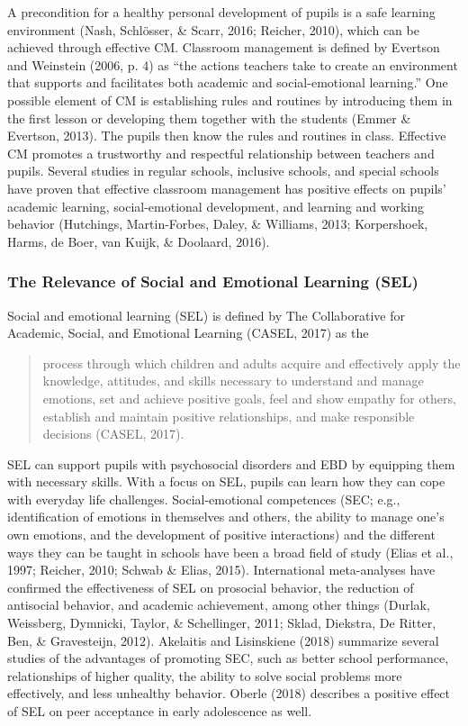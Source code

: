 \documentclass[11.5pt]{sig-alternate} %
\begin{document}
\begin{large}
A precondition for a healthy personal development of pupils is a safe learning environment (Nash, Schlösser, \& Scarr, 2016; Reicher, 2010), which can be achieved through effective CM. Classroom management is defined by Evertson and Weinstein (2006, p. 4) as “the actions teachers take to create an environment that supports and facilitates both academic and social-emotional learning.” One possible element of CM is establishing rules and routines by introducing them in the first lesson or developing them together with the students (Emmer \& Evertson, 2013). The pupils then know the rules and routines in class. Effective CM promotes a trustworthy and respectful relationship between teachers and pupils. Several studies in regular schools, inclusive schools, and special schools have proven that effective classroom management has positive effects on pupils’ academic learning, social-emotional development, and learning and working behavior (Hutchings, Martin-Forbes, Daley, \& Williams, 2013; Korpershoek, Harms, de Boer, van Kuijk, \& Doolaard, 2016).

\subsubsection*{The Relevance of Social and Emotional Learning (SEL)} 

Social and emotional learning (SEL) is defined by The Collaborative for Academic, Social, and Emotional Learning (CASEL, 2017) as the
\begin{quote}
    process through which children and adults acquire and effectively apply the knowledge, attitudes, and skills necessary to understand and manage emotions, set and achieve positive goals, feel and show empathy for others, establish and maintain positive relationships, and make responsible decisions (CASEL, 2017).
\end{quote}

SEL can support pupils with psychosocial disorders and EBD by equipping them with necessary skills. With a focus on SEL, pupils can learn how they can cope with everyday life challenges. Social-emotional competences (SEC; e.g., identification of emotions in themselves and others, the ability to manage one’s own emotions, and the development of positive interactions) and the different ways they can be taught in schools have been a broad field of study (Elias et al., 1997; Reicher, 2010; Schwab \& Elias, 2015). International meta-analyses have confirmed the effectiveness of SEL on prosocial behavior, the reduction of antisocial behavior, and academic achievement, among other things (Durlak, Weissberg, Dymnicki, Taylor, \& Schellinger, 2011; Sklad, Diekstra, De Ritter, Ben, \& Gravesteijn, 2012). Akelaitis and Lisinskiene (2018) summarize several studies of the advantages of promoting SEC, such as better school performance, relationships of higher quality, the ability to solve social problems more effectively, and less unhealthy behavior. Oberle (2018) describes a positive effect of SEL on peer acceptance in early adolescence as well.


\end{large}
\end{document}
